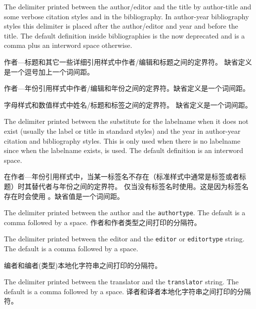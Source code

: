 \begin{ltxsyntax}
\CSdelimMark
The delimiter printed between the author\slash editor and the title by author-title and some verbose citation styles and in the bibliography. In author-year bibliography styles this delimiter is placed after the author\slash editor and year and before the title. The default definition inside bibliographies is the now deprecated  and is a comma plus an interword space otherwise.

作者---标题和其它一些详细引用样式中作者/编辑和标题之间的定界符。
缺省定义是一个逗号加上一个词间距。

\CSdelimMark
作者---年份引用样式中作者/编辑和年份之间的定界符。缺省定义是一个词间距。

\CSdelimMark
字母样式和数值样式中姓名\slash 标题和标签之间的定界符。
缺省定义是一个词间距。

\CSdelimMark
The delimiter printed between the substitute for the labelname when it does not exist (usually the label or title in standard styles) and the year in author-year citation and bibliography styles. This is only used when there is no labelname since when the labelname exists,  is used. The default definition is an interword space.

在作者---年份引用样式中，当某一标签名不存在（标准样式中通常是标签或者标题）时其替代者与年份之间的定界符。
仅当没有标签名时使用。这是因为标签名存在时会使用 。缺省值是一个词间距。

\CSdelimMark
The delimiter printed between the author and the \texttt{authortype}. The default is a comma followed by a space.
作者和作者类型之间打印的分隔符。

\CSdelimMark
The delimiter printed between the editor and the \texttt{editor} or \texttt{editortype} string. The default is a comma followed by a space.

编者和编者(类型)本地化字符串之间打印的分隔符。

\CSdelimMark
The delimiter printed between the translator and the \texttt{translator} string. The default is a comma followed by a space.
译者和译者本地化字符串之间打印的分隔符。


\end{ltxsyntax}
